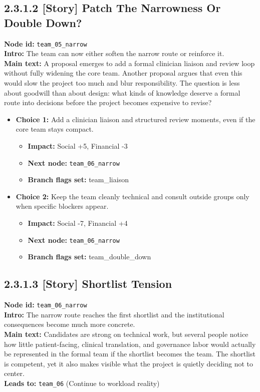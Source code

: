 \documentclass[11pt]{article}
\begin{document}
\subsection*{2.3.1.2 [Story] Patch The Narrowness Or Double Down?}
\textbf{Node id:} \texttt{team\_05\_narrow}\\
\textbf{Intro:} The team can now either soften the narrow route or reinforce it.\\
\textbf{Main text:} A proposal emerges to add a formal clinician liaison and review loop without fully widening the core team. Another proposal argues that even this would slow the project too much and blur responsibility. The question is less about goodwill than about design: what kinds of knowledge deserve a formal route into decisions before the project becomes expensive to revise?\\
\begin{itemize}
\item \textbf{Choice 1:} Add a clinician liaison and structured review moments, even if the core team stays compact.
\begin{itemize}
\item \textbf{Impact:} Social +5, Financial -3
\item \textbf{Next node:} \texttt{team\_06\_narrow}
\item \textbf{Branch flags set:} team\_liaison
\end{itemize}
\item \textbf{Choice 2:} Keep the team cleanly technical and consult outside groups only when specific blockers appear.
\begin{itemize}
\item \textbf{Impact:} Social -7, Financial +4
\item \textbf{Next node:} \texttt{team\_06\_narrow}
\item \textbf{Branch flags set:} team\_double\_down
\end{itemize}
\end{itemize}
\subsection*{2.3.1.3 [Story] Shortlist Tension}
\textbf{Node id:} \texttt{team\_06\_narrow}\\
\textbf{Intro:} The narrow route reaches the first shortlist and the institutional consequences become much more concrete.\\
\textbf{Main text:} Candidates are strong on technical work, but several people notice how little patient-facing, clinical translation, and governance labor would actually be represented in the formal team if the shortlist becomes the team. The shortlist is competent, yet it also makes visible what the project is quietly deciding not to center.\\
\textbf{Leads to:} \texttt{team\_06} (Continue to workload reality)\\
\end{document}

